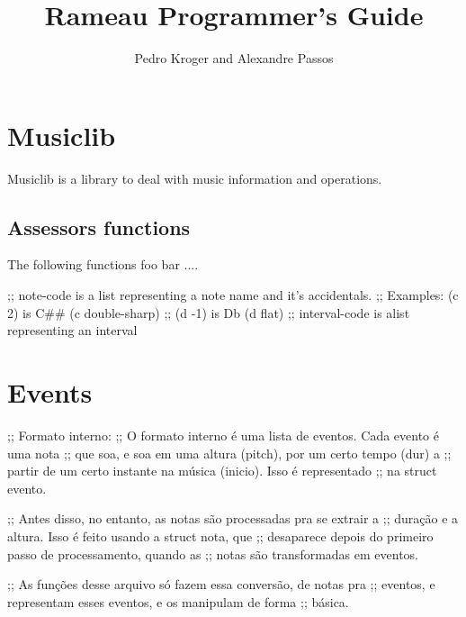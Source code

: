 \documentclass{article}
\title{Rameau Programmer's Guide}
\author{Pedro Kroger and Alexandre Passos}
\begin{document}
\maketitle

\section{Musiclib}
\label{sec:musiclib}

Musiclib is a library to deal with music information and operations.

\subsection{Assessors functions}
\label{sec:accessors-functions}

The following functions foo bar ....

;; note-code is a list representing a note name and it's accidentals.
;;   Examples: (c 2)  is C## (c double-sharp)
;;             (d -1) is Db (d flat)
;; interval-code is alist representing an interval


\section{Events}
\label{sec:events}

;; Formato interno:
;; O formato interno é uma lista de eventos. Cada evento é uma nota
;; que soa, e soa em uma altura (pitch), por um certo tempo (dur) a
;; partir de um certo instante na música (inicio). Isso é representado
;; na struct evento.

;; Antes disso, no entanto, as notas são processadas pra se extrair a
;; duração e a altura. Isso é feito usando a struct nota, que
;; desaparece depois do primeiro passo de processamento, quando as
;; notas são transformadas em eventos.

;; As funções desse arquivo só fazem essa conversão, de notas pra
;; eventos, e representam esses eventos, e os manipulam de forma
;; básica.



\end{document}

